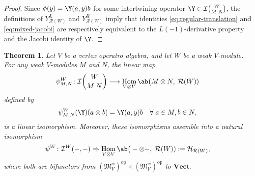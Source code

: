 \documentclass[12pt, english]{article}
\numberwithin{equation}{section}
\DeclareMathOperator{\Hom}{Hom}
\DeclareMathOperator{\opp}{op}
\theoremstyle{plain}
\newtheorem{theorem}[lemma]{Theorem}
\theoremstyle{definition}
\theoremstyle{remark}
\begin{document}
	\begin{proof}
		Since $\phi(y) = \Y(a, y) b$ for some intertwining operator $ \Y \in \mathcal{I}\binom{W}{M \; N}$,
		the definitions of $Y^L_{\mathcal{R}(W)}$ and $ Y^R_{\mathcal{R}(W)}$
		imply that identities \eqref{eq:regular-translation} and \eqref{eq:mixed-jacobi} are respectively equivalent to the $L(-1)$-derivative property and the Jacobi identity of $\Y$.
		
	\end{proof}
	
	\begin{theorem} \label{thm:hom-realization}
		Let $V$ be a vertex operatro algebra, and let $W$ be a weak $V$-module. For any weak $V$-modules $M$ and $N$, the linear map
		\begin{align}\label{eq:hom-realization-map}
			\psi^{W}_{M, N}\colon \mathcal{I} \binom{W}{M \; N} \longrightarrow \Hom_{V \otimes V} \ab\big(M \otimes N, \; \mathcal{R}(W))
		\end{align}
		defined by
		\[
		\psi^{W}_{M, N}(\Y) (a \otimes b) = \Y(a, y) b \quad \forall \; a \in M, b \in N,
		\]
		is a linear isomorphism.  Moreover, these isomorphisms assemble into a natural isomorphism
		\[
		\psi^{W}\colon \mathcal{I}^{W}(-, -) \Rightarrow  
		\Hom_{V \otimes V} \ab\big(- \otimes -, \; \mathcal{R}(W)) := \mathcal{H}_{\mathcal{R}(W)},
		\]
		where both are bifunctors from $(\mathfrak{M}^w_V)^{\opp}\times(\mathfrak{M}^w_V)^{\opp}$ to $\mathbf{Vect}$.
		
	\end{theorem}
	
\end{document}
